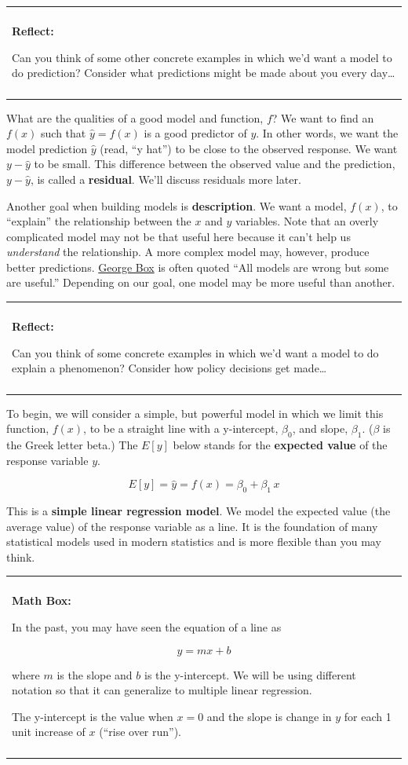 \documentclass[]{book}
\newenvironment{reflect}
{
    \begin{center}
    
    \begin{tabular}{|p{0.8\textwidth}|}
    \rowcolor{LightBlue}
    \hline\\
    \rowcolor{LightBlue}
    \textbf{Reflect:}
}
{
    \\\rowcolor{LightBlue}
    \\\hline
    \end{tabular} 
    \end{center}
}
\newenvironment{mathbox}
{
    \begin{center}
    
    \begin{tabular}{|p{0.8\textwidth}|}
    \rowcolor{LightYellow}
    \hline\\
    \rowcolor{LightYellow}
    \textbf{Math Box:}
}
{
    \\\rowcolor{LightYellow}
    \\\hline
    \end{tabular} 
    \end{center}
}
\begin{document}
\begin{reflect}
Can you think of some other concrete examples in which we'd want a model
to do prediction? Consider what predictions might be made about you
every day\ldots{}
\end{reflect}

What are the qualities of a good model and function, \(f\)? We want to find an \(f(x)\) such that \(\hat{y} = f(x)\) is a good predictor of \(y\). In other words, we want the model prediction \(\hat{y}\) (read, ``y hat'') to be close to the observed response. We want \(y-\hat{y}\) to be small. This difference between the observed value and the prediction, \(y-\hat{y}\), is called a \textbf{residual}. We'll discuss residuals more later.

Another goal when building models is \textbf{description}. We want a model, \(f(x)\), to ``explain'' the relationship between the \(x\) and \(y\) variables. Note that an overly complicated model may not be that useful here because it can't help us \emph{understand} the relationship. A more complex model may, however, produce better predictions. \href{https://en.wikipedia.org/wiki/George_E._P._Box}{George Box} is often quoted ``All models are wrong but some are useful.'' Depending on our goal, one model may be more useful than another.

\begin{reflect}
Can you think of some concrete examples in which we'd want a model to do
explain a phenomenon? Consider how policy decisions get made\ldots{}
\end{reflect}

To begin, we will consider a simple, but powerful model in which we limit this function, \(f(x)\), to be a straight line with a y-intercept, \(\beta_0\), and slope, \(\beta_1\). (\(\beta\) is the Greek letter beta.) The \(E[y]\) below stands for the \textbf{expected value} of the response variable \(y\).

\[E[y] = \hat{y} = f(x) = \beta_0 + \beta_1\,x\]

This is a \textbf{simple linear regression model}. We model the expected value (the average value) of the response variable as a line. It is the foundation of many statistical models used in modern statistics and is more flexible than you may think.

\begin{mathbox}
In the past, you may have seen the equation of a line as

\[y = mx + b\]

where \(m\) is the slope and \(b\) is the y-intercept. We will be using
different notation so that it can generalize to multiple linear
regression.

The y-intercept is the value when \(x=0\) and the slope is change in
\(y\) for each 1 unit increase of \(x\) (``rise over run'').
\end{mathbox}
\end{document}
